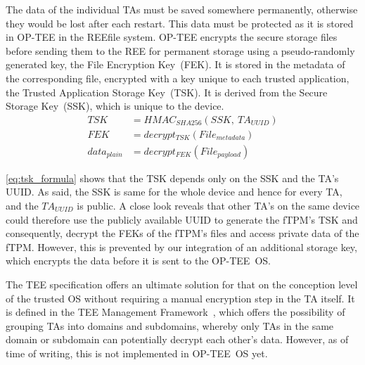 The data of the individual TAs must be saved somewhere permanently, otherwise they would be lost after each restart.
This data must be protected as it is stored in OP-TEE in the REE\@ file system.
OP-TEE encrypts the secure storage files before sending them to the REE for permanent storage using a pseudo-randomly generated key, the File Encryption Key~(FEK).
It is stored in the metadata of the corresponding file, encrypted with a key unique to each trusted application, the Trusted Application Storage Key~(TSK). %
It is derived from the Secure Storage Key~(SSK), which is unique to the device.
\begin{align}
  \label{eq:tsk_formula}
  TSK &= HMAC_{SHA256}(SSK,\ TA_{UUID})\\
  \label{eq:fek_formula}
  FEK &= decrypt_{TSK}(File_{metadata})\\
  data_{plain} &= decrypt_{FEK}(File_{payload})
\end{align}

\autoref{eq:tsk_formula} shows that the TSK depends only on the SSK and the TA's UUID\@.
As said, the SSK is same for the whole device and hence for every TA, and the \( TA_{UUID} \) is public.
A close look reveals that other TA's on the same device could therefore use the publicly available UUID to generate the fTPM's TSK and consequently, decrypt the FEKs of the fTPM's files and access private data of the fTPM\@.
However, this is prevented by our integration of an additional storage key, which encrypts the data before it is sent to the OP-TEE~OS\@.

The TEE specification offers an ultimate solution for that on the conception level of the trusted OS without requiring a manual encryption step in the TA itself.
It is defined in the TEE Management Framework~\cite{GP_ManagementFramework}, which offers the possibility of grouping TAs into domains and subdomains, whereby only TAs in the same domain or subdomain can potentially decrypt each other's data.
However, as of time of writing, this is not implemented in OP-TEE~OS yet.

